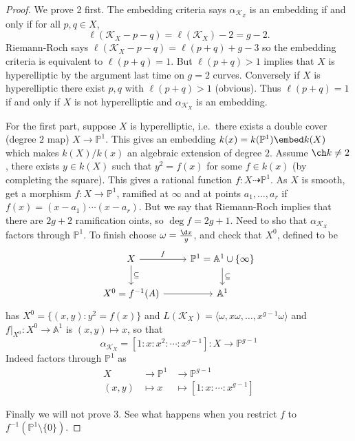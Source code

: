 \documentclass[a4paper]{article}
\renewcommand{\A}{\mathbb{A}}
\renewcommand*{\P}{\mathbb{P}}
\newcommand{\rational}{\dashrightarrow} %
\begin{document}
\begin{proof}
  We prove 2 first. The embedding criteria says \(\alpha_{\mathcal K_Z}\) is an embedding if and only if for all \(p, q \in X\),
  \[
    \ell(\mathcal K_X - p - q) = \ell(\mathcal K_X) - 2 = g - 2.
  \]
  Riemann-Roch says \(\ell(\mathcal K_X - p - q) = \ell(p + q) + g - 3\) so the embedding criteria is equivalent to \(\ell(p + q) = 1\). But \(\ell(p + q) > 1\) implies that \(X\) is hyperelliptic by the argument last time on \(g = 2\) curves. Conversely if \(X\) is hyperelliptic there exist \(p, q\) with \(\ell(p + q) > 1\) (obvious). Thus \(\ell(p + q) = 1\) if and only if \(X\) is not hyperelliptic and \(\alpha_{\mathcal K_X}\) is an embedding.

  For the first part, suppose \(X\) is hyperelliptic, i.e.\ there exists a double cover (degree \(2\) map) \(X \to \P^1\). This gives an embedding \(k(x) = k(\P^1) \embed k(X)\) which makes \(k(X)/k(x)\) an algebraic extension of degree \(2\). Assume \(\ch k \neq 2\), there exists \(y \in k(X)\) such that \(y^2 = f(x)\) for some \(f \in k(x)\) (by completing the square). This gives a rational function \(f: X \rational \P^1\). As \(X\) is smooth, get a morphism \(f: X \to \P^1\), ramified at \(\infty\) and at points \(a_1, \dots, a_r\) if \(f(x) = (x - a_1) \cdots (x - a_r)\). But we say that Riemann-Roch implies that there are \(2g + 2\) ramification oints, so \(\deg f = 2g + 1\). Need to sho that \(\alpha_{\mathcal K_X}\) factors through \(\P^1\). To finish choose \(\omega = \frac{\d x}{y}\), and check that \(X^0\), defined to be
  \[
    \begin{tikzcd}
      X \ar[r, "f"] \ar[d, "\subseteq"] & \P^1 = \A^1 \cup \{\infty\} \ar[d, "\subseteq"] \\
      X^0 = f^{-1}(A) \ar[r] & \A^1
    \end{tikzcd}
  \]
  has \(X^0 = \{(x, y): y^2 = f(x)\}\) and \(L(\mathcal K_X) = \langle \omega, x\omega, \dots, x^{g - 1} \omega \rangle\) and \(f|_{X^0}: X^0 \to \A^1\) is \((x, y) \mapsto x\), so that
  \[
    \alpha_{\mathcal K_X} = [1:x:x^2:\cdots:x^{g - 1}]: X \to \P^{g - 1}
  \]
  Indeed factors through \(\P^1\) as
  \begin{align*}
    X &\to \P^1 &\to \P^{g - 1} \\
    (x, y) &\mapsto x &\mapsto [1:x: \cdots : x^{g - 1}]
  \end{align*}

  Finally we will not prove 3. See what happens when you restrict \(f\) to \(f^{-1}(\P^1 \setminus \{0\})\).
\end{proof}
\end{document}
